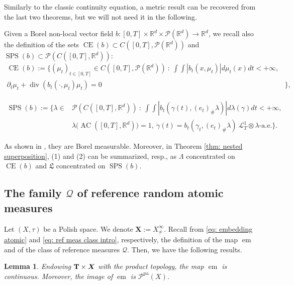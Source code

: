 \documentclass[10pt,leqno]{amsart}
\numberwithin{equation}{section}
\newtheorem{lemma}[teorema]{Lemma}
\newcommand{\R}{\mathbb{R}}
\newcommand{\PP}{\mathcal{P}}
\newcommand{\CE}{\operatorname{CE}}
\newcommand{\PPpa}{\PP^{\operatorname{pa}}}
\begin{document}
Similarly to the classic continuity equation, a metric result can be recovered from the last two theorems, but we will not need it in the following.

Given a Borel non-local vector field $b:[0,T]\times \R^d \times \PP(\R^d) \to \R^d$, we recall also the definition of the sets $\operatorname{CE}(b) \subset C([0,T],\PP(\R^d))$ and $\operatorname{SPS}(b) \subset \PP(C([0,T],\R^d))$: 
\begin{equation}
\begin{aligned}
    \CE(b):= \bigg\{(\mu_t)_{t\in[0,T]} \in C([0,T],\PP(\R^d)) \ : \ 
    \int \int |b_t(x,\mu_t)|d\mu_t(x) dt <+\infty, & \\
    \partial_t\mu_t + \operatorname{div}(b_t(\cdot,\mu_t)\mu_t)=0& \bigg\},
\end{aligned}
\end{equation}

\begin{equation}\label{SPSb}
\begin{aligned}
    \operatorname{SPS}(b):= \{\lambda \in & \PP(C([0,T],\R^d)) \ : \ \int \int |b_t(\gamma(t),(e_t)_\#\lambda)| d\lambda(\gamma) dt<+\infty ,
    \\
    &\lambda \big( \operatorname{AC}([0,T],\R^d) \big) =1, \ \dot{\gamma}(t) = b_t(\gamma_t,(e_t)_\#\lambda) \ \mathcal{L}^1_T\otimes\lambda\text{-a.e.} \}.
\end{aligned}
\end{equation}

As shown in \cite[Section 5]{pinzisavare2025}, they are Borel measurable. Moreover, in Theorem \ref{thm: nested superposition}, (1) and (2) can be summarized, resp., as $\Lambda$ concentrated on $\operatorname{CE}(b)$ and $\mathfrak{L}$ concentrated on $\operatorname{SPS}(b)$. 



\subsection{The family \texorpdfstring{$\mathcal{Q}$}{} of reference random atomic measures}\label{subsec: reference}
Let $(X,\tau)$ be a Polish space. We denote $\boldsymbol{X}:= X^\infty_{\neq}$.
Recall from \eqref{eq: embedding atomic} and \eqref{eq: ref meas class intro}, respectively, the definition of the map $\operatorname{em}$ and of the class of reference measures $\mathcal{Q}$. Then, we have the following results.

\begin{lemma}
    Endowing $\bold{T}\times \boldsymbol{X}$ with the product topology, the map $\operatorname{em}$ is continuous. Moreover, the image of $\operatorname{em}$ is $\PPpa(X)$.
\end{lemma}
\end{document}
